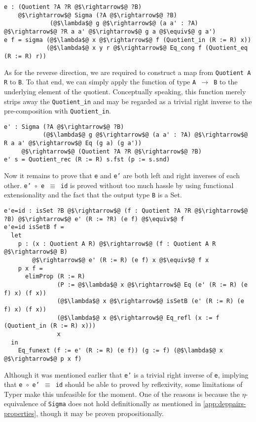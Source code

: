 \documentclass[12pt,twoside,maitrise]{dms}
\theoremstyle{definition}
\numberwithin{equation}{section}
\numberwithin{table}{chapter}
\numberwithin{figure}{chapter}
\newcommand\id[1] {\texttt{#1}}
\newcommand\fn[1] {\texttt{#1}}
\begin{document}
\begin{verbatim}
e : (Quotient ?A ?R @$\rightarrow$@ ?B)
    @$\rightarrow$@ Sigma (?A @$\rightarrow$@ ?B)
             (@$\lambda$@ g @$\rightarrow$@ (a a' : ?A) @$\rightarrow$@ ?R a a' @$\rightarrow$@ g a @$\equiv$@ g a')
e f = sigma (@$\lambda$@ x @$\rightarrow$@ f (Quotient_in (R := R) x))
            (@$\lambda$@ x y r @$\rightarrow$@ Eq_cong f (Quotient_eq (R := R) r))
\end{verbatim}

As for the reverse direction, we are required to construct a map from
\fn{Quotient A R} to \id{B}. To that end, we can simply apply the function of
type \fn{A $\rightarrow$ B} to the underlying element of the quotient.
Conceptually speaking, this function merely strips away the \id{Quotient\_in}
and may be regarded as a trivial right inverse to the pre-composition with
\id{Quotient\_in}.

\begin{verbatim}
e' : Sigma (?A @$\rightarrow$@ ?B)
           (@$\lambda$@ g @$\rightarrow$@ (a a' : ?A) @$\rightarrow$@ R a a' @$\rightarrow$@ Eq (g a) (g a'))
     @$\rightarrow$@ (Quotient ?A ?R @$\rightarrow$@ ?B)
e' s = Quotient_rec (R := R) s.fst (p := s.snd)
\end{verbatim}

Now it remains to prove that \id{e} and \id{e'} are both left and right inverses
of each other. \fn{e' $\circ{}$ e $\equiv$ id} is proved without too much hassle
by using functional extensionality and the fact that the output type \id{B} is a
Set.

\begin{verbatim}
e'e=id : isSet ?B @$\rightarrow$@ (f : Quotient ?A ?R @$\rightarrow$@ ?B) @$\rightarrow$@ e' (R := ?R) (e f) @$\equiv$@ f
e'e=id isSetB f =
  let
    p : (x : Quotient A R) @$\rightarrow$@ (f : Quotient A R @$\rightarrow$@ B)
        @$\rightarrow$@ e' (R := R) (e f) x @$\equiv$@ f x
    p x f =
      elimProp (R := R)
               (P := @$\lambda$@ x @$\rightarrow$@ Eq (e' (R := R) (e f) x) (f x))
               (@$\lambda$@ x @$\rightarrow$@ isSetB (e' (R := R) (e f) x) (f x))
               (@$\lambda$@ x @$\rightarrow$@ Eq_refl (x := f (Quotient_in (R := R) x)))
               x
  in
    Eq_funext (f := e' (R := R) (e f)) (g := f) (@$\lambda$@ x @$\rightarrow$@ p x f)
\end{verbatim}

Although it was mentioned earlier that \id{e'} is a trivial right inverse of
\id{e}, implying that \fn{e $\circ{}$ e' $\equiv$ id} should be able to proved
by reflexivity, some limitations of Typer make this unfeasible for the moment.
One of the reasons is because the $\eta$-equivalence of \id{Sigma} does not hold
definitionally as mentioned in \autoref{app:deppairs-properties}, though it may
be proven propositionally.
\end{document}
